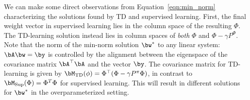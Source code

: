 We can make some direct observations from Equation~\ref{eqn:min_norm}
characterizing the solutions found by TD and supervised learning.
First, the final weight vector in supervised learning lies in the column space of the resulting $\Phi$. The TD-learning solution instead lies in column spaces of \emph{both} $\Phi$ and $\Phi - \gamma P^\Phi$.
Note that the norm of the  min-norm solution $\bw^*$ to any linear system: $\bA \bw = \by$ is controlled by the alignment between the eigenspace of the covariance matrix $\bA^\top \bA$ and the vector $\by$. The covariance matrix for TD-learning is given by $\bM_{\mathrm{TD}}(\phi) = \Phi^\top (\Phi - \gamma P^\pi \Phi)$, in contrast to $\bM_{\mathrm{Sup}}(\Phi) = \Phi^T \Phi$ for supervised learning. This will result in different solutions for $\bw^*$ in the overparameterized setting.


